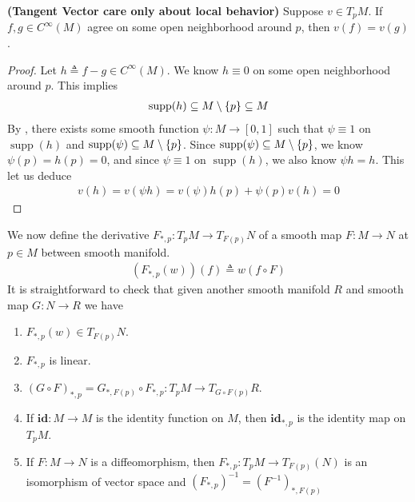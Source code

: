 \documentclass{report}
\begin{document}
\begin{theorem}
\label{Tangent Vector care only about local behavior}
\textbf{(Tangent Vector care only about local behavior)} Suppose $v \in T_pM$. If $f,g \in C^{\infty}(M)$ agree on some open neighborhood around $p$, then  $v(f)=v(g)$. 
\end{theorem}
\begin{proof}
Let $h\triangleq f-g \in C^{\infty}(M)$. We know $h\equiv 0$ on some open neighborhood around $p$. This implies 
 \begin{align*}
\operatorname{supp}(h)\subseteq M \setminus \{ p \}\subseteq M
\end{align*}
By , there exists some smooth function $\psi : M \rightarrow [0,1]$ such that $\psi \equiv 1$ on $\operatorname{supp}(h)$ and $\operatorname{supp}(\psi)\subseteq M \setminus \{ p \}$. Since $\operatorname{supp}(\psi )\subseteq M \setminus \{ p \}$, we know $\psi (p)=h(p)=0$, and since $\psi \equiv 1$ on $\operatorname{supp}(h)$, we also know $\psi h=h$. This let us deduce 
\begin{align*}
v(h)=v(\psi h)=v(\psi)h(p)+\psi (p) v(h)=0  
\end{align*}



\end{proof}
\begin{mdframed}
We now define the derivative  $F_{*,p}:T_pM\rightarrow T_{F(p)}N$ of a smooth map $F:M\rightarrow N$ at $p\in  M$ between smooth manifold. 
\begin{align*}
  (F_{*,p}(w))(f)\triangleq w(f\circ F)
\end{align*}
It is straightforward to check that given another smooth manifold $R$ and smooth map  $G:N\rightarrow R$ we have
\begin{enumerate}[label=(\alph*)]
  \item $F_{*,p}(w) \in T_{F(p)}N$. 
  \item  $F_{*,p}$ is linear.  
  \item $(G\circ F)_{*,p}=G_{*,F(p)}\circ F_{*,p}:T_pM\rightarrow T_{G\circ F(p)}R$. 
  \item If $\textbf{id}:M\rightarrow M$ is the identity function on $M$, then $\textbf{id}_{*,p}$ is the identity map on $T_pM$. 
  \item If $F:M\rightarrow N$ is a diffeomorphism, then  $F_{*,p}:T_pM \rightarrow T_{F(p)}(N)$ is an isomorphism of vector space and $(F_{*,p})^{-1}=(F^{-1})_{*,F(p)}$
\end{enumerate}

\end{mdframed}
\end{document}

